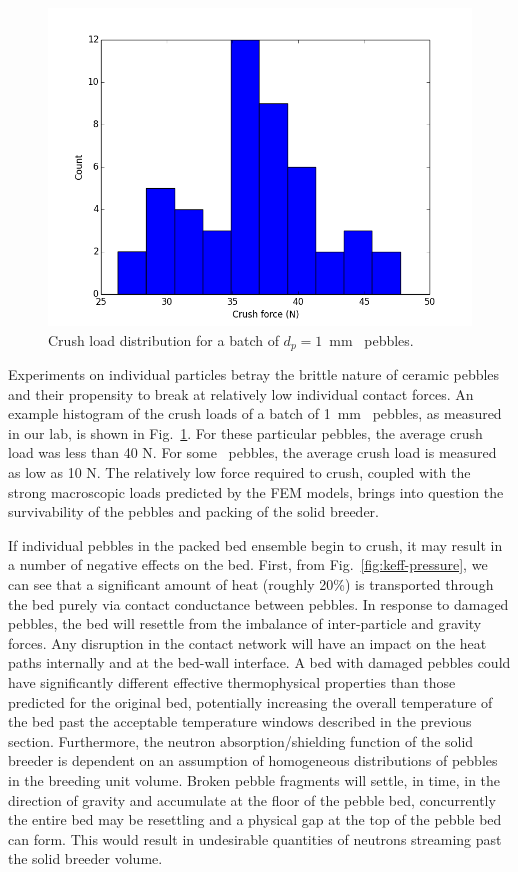 \begin{figure}[ht]
	\centering
	\includegraphics[width=\singleimagewidth]{chapters/figures/fmax} 
	\caption{Crush load distribution for a batch of $d_p = 1$~mm \lit~pebbles.}
	\label{fig:fmax}
\end{figure}


Experiments on individual particles betray the brittle nature of ceramic pebbles and their propensity to break at relatively low individual contact forces. An example histogram of the crush loads of a batch of 1~mm \lit~pebbles, as measured in our lab, is shown in Fig.~\ref{fig:fmax}. For these particular pebbles, the average crush load was less than 40 N. For some \lis~pebbles, the average crush load is measured as low as 10 N. The relatively low force required to crush, coupled with the strong macroscopic loads predicted by the FEM models, brings into question the survivability of the pebbles and packing of the solid breeder.

If individual pebbles in the packed bed ensemble begin to crush, it may result in a number of negative effects on the bed. First, from Fig.~\ref{fig:keff-pressure}, we can see that a significant amount of heat (roughly 20\%) is transported through the bed purely via contact conductance between pebbles. In response to damaged pebbles, the bed will resettle from the imbalance of inter-particle and gravity forces. Any disruption in the contact network will have an impact on the heat paths internally and at the bed-wall interface. A bed with damaged pebbles could have significantly different effective thermophysical properties than those predicted for the original bed, potentially increasing the overall temperature of the bed past the acceptable temperature windows described in the previous section. Furthermore, the neutron absorption/shielding function of the solid breeder is dependent on an assumption of homogeneous distributions of pebbles in the breeding unit volume. Broken pebble fragments will settle, in time, in the direction of gravity and accumulate at the floor of the pebble bed, concurrently the entire bed may be resettling and a physical gap at the top of the pebble bed can form. This would result in undesirable quantities of neutrons streaming past the solid breeder volume. 

